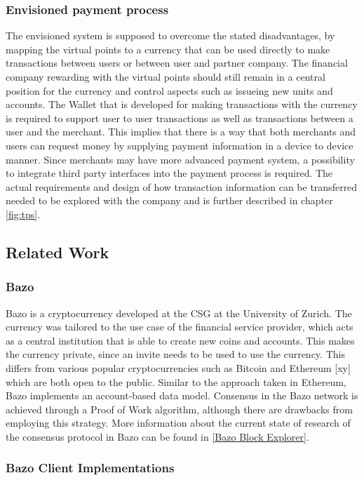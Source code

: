 \documentclass[a4paper]{article}
\begin{document}
\subsubsection{Envisioned payment process}
The envisioned system is supposed to overcome the stated disadvantages, by mapping the virtual points to a currency that can be used directly to make transactions between users or between user and partner company.
The financial company rewarding with the virtual points should still remain in a central position for the currency and control aspects such as issueing new units and accounts.
The Wallet that is developed for making transactions with the currency is required to support user to user transactions as well as transactions between a user and the merchant. This implies that there is a way that both merchants and users can request money by supplying payment information in a device to device manner. Since merchants may have more advanced payment system, a possibility to integrate third party interfaces into the payment process is required. The actual requirements and design of how transaction information can be transferred needed to be explored with the company and is further described in chapter \ref{fig:tps}.


\subsection{Related Work}
\subsubsection{Bazo}
Bazo is a cryptocurrency developed at the CSG at the University of Zurich. The currency was tailored to the use case of the financial service provider, which acts as a central institution that is able to create new coins and accounts. This makes the currency private, since an invite needs to be used to use the currency. This differs from various popular cryptocurrencies such as Bitcoin and Ethereum [xy] which are both open to the public. Similar to the approach taken in Ethereum, Bazo implements an account-based data model. Consensus in the Bazo network is achieved through a Proof of Work algorithm, although there are drawbacks from employing this strategy. More information about the current state of research of the consensus protocol in Bazo can be found in \ref{Bazo Block Explorer}.

\subsubsection{Bazo Client Implementations}
\end{document}
